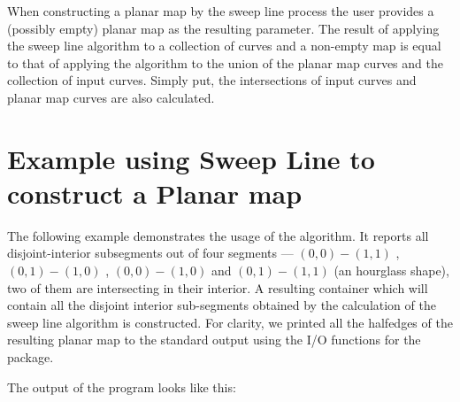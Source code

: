When constructing a planar map by the sweep line process the user 
provides a (possibly empty) planar map as the resulting parameter. 
The result of applying the sweep line algorithm to a 
collection of curves and a non-empty map is equal to that 
of applying the algorithm to the union of the
planar map curves and the collection of input curves. Simply put,
the intersections of input curves and planar map curves are also
calculated.

\section{Example using Sweep Line to construct a Planar map}
\label{ssec:example1_sweep}
The following example demonstrates the usage of the 
 algorithm. 
It reports all disjoint-interior subsegments out of four segments
--- $(0,0)-(1,1)$ , $(0,1)-(1,0)$ , $(0,0)-(1,0)$ and $(0,1)-(1,1)$
(an hourglass shape), two of them are intersecting in their
interior. A resulting container which will contain all the disjoint
interior sub-segments obtained by the calculation of the sweep
line algorithm is constructed. For clarity, we printed all the halfedges of the
resulting planar map to the standard output using the I/O functions
for the  package.


The output of the program looks like this:








